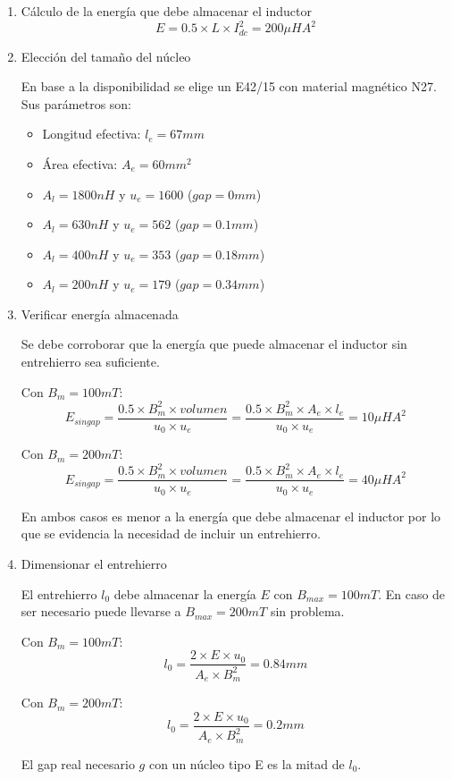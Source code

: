 \begin{enumerate}
\item{Cálculo de la energía que debe almacenar el inductor}
$$ E=0.5\times L\times I_{dc}^2=200\mu HA^2 $$
\item{Elección del tamaño del núcleo}

En base a la disponibilidad se elige un E42/15 con material magnético N27. 
Sus parámetros son:

\begin{itemize}
    \item Longitud efectiva: $l_e=67mm$
    \item Área efectiva: $A_e=60{mm}^2$
    \item $A_l=1800nH$ y $u_e=1600$ ($gap=0mm$)
    \item $A_l=630nH$ y $u_e=562$ ($gap=0.1mm$)
    \item $A_l=400nH$ y $u_e=353$ ($gap=0.18mm$)
    \item $A_l=200nH$ y $u_e=179$ ($gap=0.34mm$)
\end{itemize}

\item{Verificar energía almacenada}

Se debe corroborar que la energía que puede almacenar el inductor sin entrehierro sea suficiente.

Con $B_m=100mT$:
$$ E_{singap}=\frac{0.5\times B_m^2\times {volumen}}{u_0\times u_e}=\frac{0.5\times B_m^2\times A_e\times l_e}{u_0\times u_e}=10\mu HA^2 $$

Con $B_m=200mT$:
$$ E_{singap}=\frac{0.5\times B_m^2\times {volumen}}{u_0\times u_e}=\frac{0.5\times B_m^2\times A_e\times l_e}{u_0\times u_e}=40\mu HA^2 $$

En ambos casos es menor a la energía que debe almacenar el inductor por lo que se evidencia la necesidad de incluir un entrehierro. 

\item{Dimensionar el entrehierro}

El entrehierro $l_0$ debe almacenar la energía $E$ con $B_{max}=100mT$.
En caso de ser necesario puede llevarse a $B_{max}=200mT$ sin problema. 

Con $B_m=100mT$:
$$ l_0=\frac{2\times E\times u_0}{A_e\times B_m^2}=0.84mm $$

Con $B_m=200mT$:
$$ l_0=\frac{2\times E\times u_0}{A_e\times B_m^2}=0.2mm $$

El gap real necesario $g$ con un núcleo tipo E es la mitad de $l_0$.


\end{enumerate}
